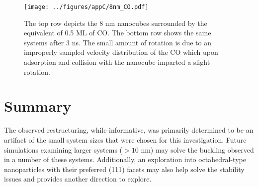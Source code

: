 \begin{landscape}
\begin{figure}[p!]
\centering
  \texttt{[image: ../figures/appC/8nm\_CO.pdf]}
  \caption{The top row depicts the 8 nm nanocubes surrounded by the equivalent
of 0.5 ML of CO. The bottom row shows the same systems after 3 ns.  The small
amount of rotation is due to an improperly sampled velocity distribution of the
CO which upon adsorption and collision with the nanocube imparted a slight
rotation.}
  \label{fig:8nmCO}
\end{figure}
\end{landscape}

\section{Summary}
The observed restructuring, while informative, was primarily determined to be an
artifact of the small system sizes that were chosen for this investigation.
Future simulations examining larger systems ($>10$ nm) may solve the buckling
observed in a number of these systems. Additionally, an exploration into
octahedral-type nanoparticles with their preferred (111) facets may also help
solve the stability issues and provides another direction to explore.
